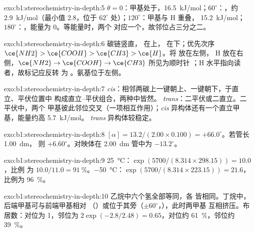 \begin{solution}{exo:b1:stereochemistry-in-depth:5}
$\theta = 0$：甲基处于，\qty{16.5}{kJ/mol}；$60^\circ$：，约
\qty{2.9}{kJ/mol}（最小值 2.8，位于 $62^\circ$ 处）；$120^\circ$：甲基与 H 重叠，
\qty{15.2}{kJ/mol}；$180^\circ$：，能量为 0。等能量时，两个
对应一个，故邻位占三分之二。
\end{solution}

\begin{solution}{exo:b1:stereochemistry-in-depth:6}
碳链竖直， 在上， 在下；优先次序
$\ce{NH2} > \ce{COOH} > \ce{CH3} > \ce{H}$。将  放在左侧，
H 放在右侧，$\ce{NH2} \to \ce{COOH} \to \ce{CH3}$ 所见为顺时针
；H 水平指向读者，故标记应反转
为 。氨基位于左侧。
\end{solution}

\begin{solution}{exo:b1:stereochemistry-in-depth:7}
\textit{cis}：相邻两碳上一键朝上、一键朝下，于直立、平伏位置中
构成直立–平伏组合，两种中皆然。
\textit{trans}：二平伏或二直立。二平伏中，两个
甲基彼此邻位交叉（一项相互作用）；\textit{cis}
异构体还有一个直立甲基，能量约高 \qty{5.7}{kJ/mol}。
\textit{trans} 异构体较稳定。
\end{solution}

\begin{solution}{exo:b1:stereochemistry-in-depth:8}
$[\alpha] = 13.2/(2.00 \times 0.100) = +66.0^\circ$。若管长 \qty{1.00}{dm}，
则 $+6.60^\circ$。对映体在 \qty{2.00}{dm} 管中为 $-13.2^\circ$。
\end{solution}

\begin{solution}{exo:b1:stereochemistry-in-depth:9}
\qty{25}{\celsius}：$\exp(5700/(8.314 \times 298.15)) = 10.0$，比例
为 $10.0/11.0 = \qty{91}{\percent}$。\qty{-50}{\celsius}：$\exp(5700/(8.314
\times 223.15)) = 21.6$，比例为 \qty{96}{\percent}。
\end{solution}

\begin{solution}{exo:b1:stereochemistry-in-depth:10}
乙烷中六个氢全部等同，各
皆相同。丁烷中，后端甲基可与前端甲基相对
（）或位于其旁（$\pm 60^\circ$，），此时两甲基
互相挤压。布居数：对位为 1，邻位为 $2\exp(-2.8/2.48) = 0.65$，对位约
\qty{61}{\percent}，邻位约 \qty{39}{\percent}。
\end{solution}

